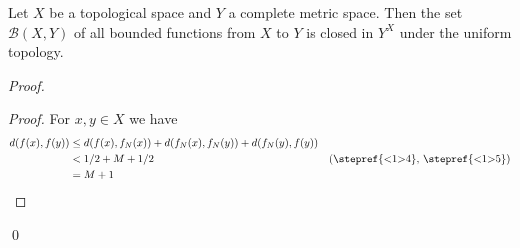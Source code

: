 \begin{thm}
  \label{thm:topology:metric:bounded_closed}
  Let $X$ be a topological space and $Y$ a complete metric space. Then the set $\mathcal{B}(X, Y)$ of all bounded functions from $X$ to $Y$ is closed in $Y^X$ under the uniform topology.
\end{thm}

\begin{proof}
  \pf
  \begin{proof}
    \pf
    For $x, y \in X$ we have
    \begin{align*}
      d(f(x), f(y)) & \leq d(f(x), f_N(x)) + d(f_N(x), f_N(y)) + d(f_N(y), f(y)) \\
      & < 1/2 + M + 1/2 & (\text{\stepref{<1>4}, \stepref{<1>5}})\\
      & = M + 1
    \end{align*}
  \end{proof}
  \qed
\end{proof}
